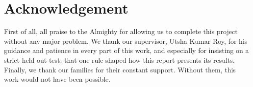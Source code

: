 \section*{Acknowledgement}
First of all, all praise to the Almighty for allowing us to complete this project without any major problem. We thank our supervisor, Utsha Kumar Roy, for his guidance and patience in every part of this work, and especially for insisting on a strict held-out test: that one rule shaped how this report presents its results. Finally, we thank our families for their constant support. Without them, this work would not have been possible.
\pagebreak
